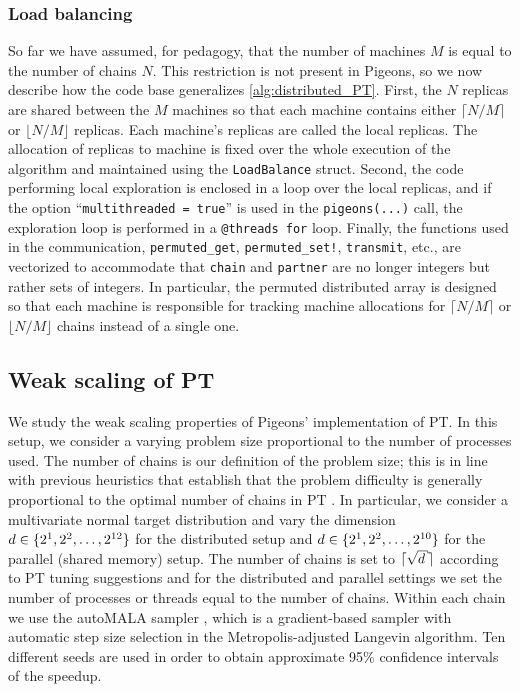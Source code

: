 \subsubsection{Load balancing}
\label{sec:relax}

So far we have assumed, for pedagogy, that the number of 
machines $M$ is equal to the number of chains $N$.
This restriction is not present in Pigeons, so we now describe how 
the code base generalizes \cref{alg:distributed_PT}. 
First, the $N$ replicas are shared between the $M$ machines so that 
each machine contains either $\lceil N/M \rceil$ or $\lfloor N/M \rfloor$ 
replicas. Each machine's replicas are called the local replicas. 
The allocation of replicas to machine is fixed over the whole execution of the 
algorithm and maintained using the \texttt{LoadBalance} struct. 
Second, the code performing local exploration is enclosed in a 
loop over the local replicas, and if the option ``\texttt{multithreaded = true}'' 
is used in the \texttt{pigeons(...)} call, the exploration loop is performed in a 
\texttt{@threads for} loop. 
Finally, the functions used in the communication, 
\texttt{permuted\_get}, \texttt{permuted\_set!}, \texttt{transmit}, etc., 
are vectorized to accommodate that \texttt{chain} and 
\texttt{partner} are no longer integers but rather sets of integers. 
In particular, the permuted distributed array is designed so that each 
machine is responsible for tracking machine allocations for 
$\lceil N/M \rceil$ or $\lfloor N/M \rfloor$ chains instead of a single one.


\subsection{Weak scaling of PT}

We study the weak scaling properties of Pigeons' implementation of PT.
In this setup, we consider a varying problem size proportional to the number of processes used. 
The number of chains is our definition of the problem size; 
this is in line with previous heuristics that establish that the problem 
difficulty is generally proportional to the optimal number of chains in PT \cite{syed2021nrpt}.
In particular, we consider a multivariate normal target distribution 
and vary the dimension $d \in \cbra{2^1, 2^2, \ldots, 2^{12}}$ for the distributed setup and 
$d \in \cbra{2^1, 2^2, \ldots, 2^{10}}$ for the parallel (shared memory) setup. 
The number of chains is set to $\ceil{\sqrt{d}}$ according to PT tuning suggestions \cite{syed2021nrpt} 
and for the distributed and parallel settings we set the number of processes or threads equal 
to the number of chains.
Within each chain we use the autoMALA sampler \cite{biron2024automala}, which is a 
gradient-based sampler with automatic step size selection in the Metropolis-adjusted Langevin algorithm.
Ten different seeds are used in order to obtain approximate 95\% confidence intervals of 
the speedup.


